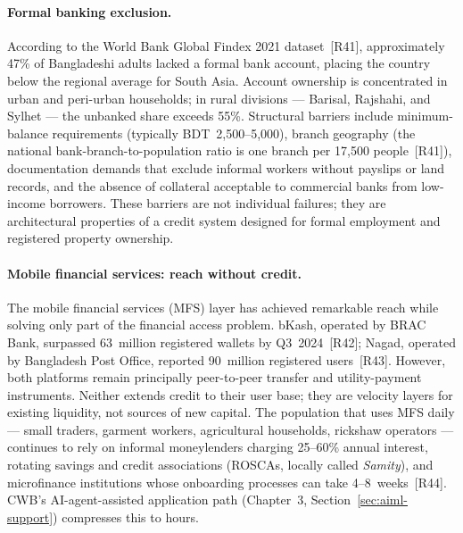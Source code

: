 \paragraph{Formal banking exclusion.}
According to the World Bank Global Findex 2021 dataset~[R41], approximately
47\% of Bangladeshi adults lacked a formal bank account, placing the country
below the regional average for South Asia. Account ownership is concentrated
in urban and peri-urban households; in rural divisions --- Barisal, Rajshahi,
and Sylhet --- the unbanked share exceeds 55\%. Structural barriers include
minimum-balance requirements (typically BDT~2,500--5,000), branch geography
(the national bank-branch-to-population ratio is one branch per 17,500
people~[R41]), documentation demands that exclude informal workers without
payslips or land records, and the absence of collateral acceptable to
commercial banks from low-income borrowers. These barriers are not individual
failures; they are architectural properties of a credit system designed for
formal employment and registered property ownership.

\paragraph{Mobile financial services: reach without credit.}
The mobile financial services (MFS) layer has achieved remarkable reach while
solving only part of the financial access problem. bKash, operated by BRAC
Bank, surpassed 63~million registered wallets by Q3~2024~[R42]; Nagad,
operated by Bangladesh Post Office, reported 90~million registered
users~[R43]. However, both platforms remain principally peer-to-peer transfer
and utility-payment instruments. Neither extends credit to their user base;
they are velocity layers for existing liquidity, not sources of new capital.
The population that uses MFS daily --- small traders, garment workers,
agricultural households, rickshaw operators --- continues to rely on informal
moneylenders charging 25--60\% annual interest, rotating savings and credit
associations (ROSCAs, locally called \emph{Samity}), and microfinance
institutions whose onboarding processes can take 4--8~weeks~[R44].
CWB's AI-agent-assisted application path (Chapter~3,
Section~\ref{sec:aiml-support}) compresses this to hours.

